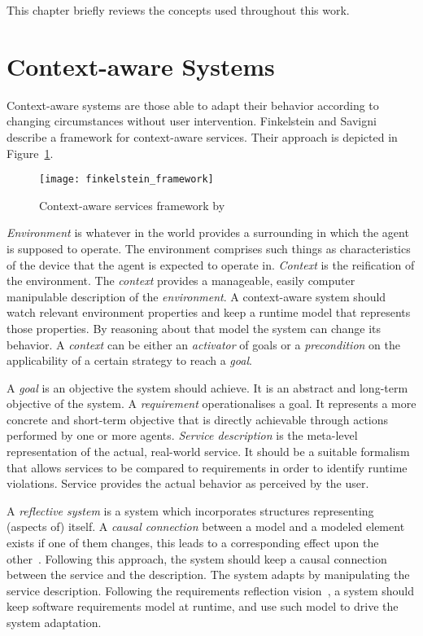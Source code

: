 This chapter briefly reviews the concepts used throughout this work.


\section{Context-aware Systems}
Context-aware systems are those able to adapt their behavior according to changing circumstances without user intervention. Finkelstein and Savigni~\cite{finkelstein_framework_2001} describe a framework for context-aware services. Their approach is depicted in Figure~\ref{fig:finkelstein_framework}.

\begin{figure}[!htb]
  \centering
  \texttt{[image: finkelstein\_framework]}
  \caption{Context-aware services framework by~\cite{finkelstein_framework_2001}}
\label{fig:finkelstein_framework}
\end{figure}

\emph{Environment} is whatever in the world provides a surrounding in which the agent is supposed to operate. The environment comprises such things as characteristics of the device that the agent is expected to operate in.
\emph{Context} is the reification of the environment. The \emph{context} provides a manageable, easily computer manipulable description of the \emph{environment}. A context-aware system should watch relevant environment properties and keep a runtime model that represents those properties. By reasoning about that model the system can change its behavior. A \emph{context} can be either an \emph{activator} of goals or a \emph{precondition} on the applicability of a certain strategy to reach a \emph{goal}.

A \emph{goal} is an objective the system should achieve. It is an abstract and long-term objective of the system. A \emph{requirement} operationalises a goal. It represents a more concrete and short-term objective that is directly achievable through actions performed by one or more agents. \emph{Service description} is the meta-level representation of the actual, real-world service. It should be a suitable formalism that allows services to be compared to requirements in order to identify runtime violations. Service provides the actual behavior as perceived by the user.

A \emph{reflective system} is a system which incorporates structures representing (aspects of) itself. A \emph{causal connection} between a model and a modeled element exists if one of them changes, this leads to a corresponding effect upon the other~\cite{maes_concepts_1987}. Following this approach, the system should keep a causal connection between the service and the description. The system adapts by manipulating the service description.
Following the requirements reflection vision~\cite{bencomo_requirements_2010}, a system should keep software requirements model at runtime, and use such model to drive the system adaptation.
